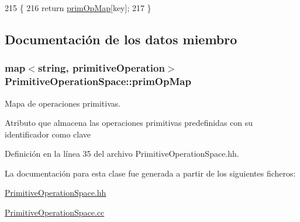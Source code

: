 \begin{DoxyCode}
215 \{
216   \textcolor{keywordflow}{return} \hyperlink{class_primitive_operation_space_afd359615001ed1e9b44b9618287834ec}{primOpMap}[key];
217 \}
\end{DoxyCode}


\subsection{Documentación de los datos miembro}
\subsubsection[{\texorpdfstring{prim\+Op\+Map}{primOpMap}}]{\setlength{\rightskip}{0pt plus 5cm}map$<$string, {\bf primitive\+Operation}$>$ Primitive\+Operation\+Space\+::prim\+Op\+Map\hspace{0.3cm}{\ttfamily [private]}}\hypertarget{class_primitive_operation_space_afd359615001ed1e9b44b9618287834ec}{}\label{class_primitive_operation_space_afd359615001ed1e9b44b9618287834ec}


Mapa de operaciones primitivas. 

Atributo que almacena las operaciones primitivas predefinidas con su identificador como clave 

Definición en la línea 35 del archivo Primitive\+Operation\+Space.\+hh.



La documentación para esta clase fue generada a partir de los siguientes ficheros\+:\begin{DoxyCompactItemize}
\item 
\hyperlink{_primitive_operation_space_8hh}{Primitive\+Operation\+Space.\+hh}\item 
\hyperlink{_primitive_operation_space_8cc}{Primitive\+Operation\+Space.\+cc}\end{DoxyCompactItemize}
